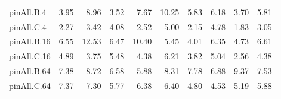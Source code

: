 \begin{table*}[]
\begin{center}
\begin{tabular}{|l|rrrrrrrr|r|}
\hline
 pinAll.B.4   & 3.95 &  8.96 & 3.52 &  7.67 & 10.25 & 5.83 & 6.18 & 3.70 & 5.81 \\
 pinAll.C.4   & 2.27 &  3.42 & 4.08 &  2.52 &  5.00 & 2.15 & 4.78 & 1.83 & 3.05 \\
\hline
 pinAll.B.16  & 6.55 & 12.53 & 6.47 & 10.40 &  5.45 & 4.01 & 6.35 & 4.73 & 6.61 \\
 pinAll.C.16  & 4.89 &  3.75 & 5.48 &  4.38 &  6.21 & 3.82 & 5.04 & 2.56 & 4.38 \\
\hline
 pinAll.B.64  & 7.38 &  8.72 & 6.58 &  5.88 &  8.31 & 7.78 & 6.88 & 9.37 & 7.53 \\
 pinAll.C.64  & 7.37 &  7.30 & 5.77 &  6.38 &  6.40 & 4.80 & 4.53 & 5.19 & 5.88 \\
\hline
\end{tabular}
\end{center}
\end{table*}
